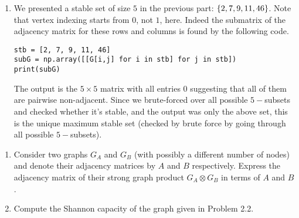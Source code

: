 \begin{enumerate}[leftmargin=*]
\item We presented a stable set of size $5$ in the previous part: $\left\{2,7,9,11,46\right\}$. Note that vertex indexing starts from $0$, not $1$, here. Indeed the submatrix of the adjacency matrix for these rows and columns is found by the following code.
\begin{verbatim}
stb = [2, 7, 9, 11, 46]
subG = np.array([[G[i,j] for i in stb] for j in stb])
print(subG)
\end{verbatim}
The output is the $5\times 5$ matrix with all entries $0$ suggesting that all of them are pairwise non-adjacent. Since we brute-forced over all possible $5-$subsets and checked whether it's stable, and the output was only the above set, this is the unique maximum stable set (checked by brute force by going through all possible $5-$subsets).
\end{enumerate}

\newpage
\pb

\begin{enumerate}[leftmargin=*]
\item Consider two graphs $G_{A}$ and \(G_{B}\) (with possibly a different number of nodes) and denote their adjacency matrices by \(A\) and \(B\) respectively. Express the adjacency matrix of their strong graph product \(G_{A} \otimes G_{B}\) in terms of \(A\) and \(B\).
\item Compute the Shannon capacity of the graph given in Problem 2.2.
\end{enumerate}


\soln

